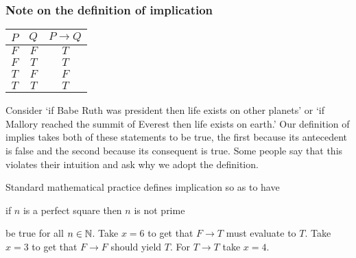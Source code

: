 \documentclass[10pt,t]{beamer}
\begin{document}
\begin{frame}
  \frametitle{Note on the definition of implication}
\begin{center}
  \begin{tabular}{cc|c}
    $P$  &$Q$  &$P \rightarrow Q$  \\ \hline
    $F$  &$F$  &$T$          \\
    $F$  &$T$  &$T$          \\
    $T$  &$F$  &$F$          \\
    $T$  &$T$  &$T$     
  \end{tabular}
\end{center}
Consider
`if Babe Ruth was president then life exists on other planets' 
or `if Mallory reached the summit of Everest then life exists on earth.' 
Our definition of implies takes both of these statements to be true, 
the first because its antecedent is false 
and the second because its consequent is true.
Some people say that this violates their intuition and ask why we 
adopt the definition. 

\pause
Standard mathematical practice defines implication so as to have 
\begin{center}
  if $n$ is a perfect square then $n$ is not prime
\end{center}
be true for all $n\in\mathbb{N}$.  
Take $x=6$ to get that $F\rightarrow T$ must evaluate to $T$.  
Take $x=3$ to get that $F\rightarrow F$ should yield $T$.
For $T\rightarrow T$ take $x=4$.
\end{frame}
\end{document}
